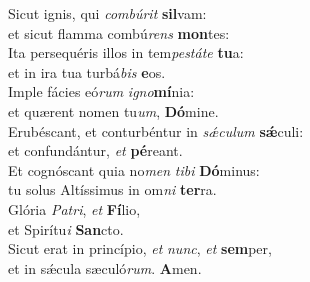 \oddverse Sicut ignis, qui \textit{com}\textit{bú}\textit{rit} \textbf{sil}vam:~\*\\
\oddverse et sicut flamma combú\textit{rens} \textbf{mon}tes:\\
\evenverse Ita persequéris illos in tem\textit{pe}\textit{stá}\textit{te} \textbf{tu}a:~\*\\
\evenverse et in ira tua turbá\textit{bis} \textbf{e}os.\\
\oddverse Imple fácies eó\textit{rum} \textit{i}\textit{gno}\textbf{mí}nia:~\*\\
\oddverse et quærent nomen tu\textit{um}, \textbf{Dó}mine.\\
\evenverse Erubéscant, et conturbéntur in \textit{sǽ}\textit{cu}\textit{lum} \textbf{sǽ}culi:~\*\\
\evenverse et confundántur, \textit{et} \textbf{pé}reant.\\
\oddverse Et cognóscant quia no\textit{men} \textit{ti}\textit{bi} \textbf{Dó}minus:~\*\\
\oddverse tu solus Altíssimus in om\textit{ni} \textbf{ter}ra.\\
\evenverse Glória \textit{Pa}\textit{tri}, \textit{et} \textbf{Fí}lio,~\*\\
\evenverse et Spirítu\textit{i} \textbf{San}cto.\\
\oddverse Sicut erat in princípio, \textit{et} \textit{nunc}, \textit{et} \textbf{sem}per,~\*\\
\oddverse et in sǽcula sæculó\textit{rum}. \textbf{A}men.\\
